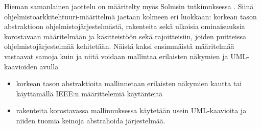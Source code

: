 \documentclass[finnish]{tktltiki2}
\numberwithin{table}{section}
\theoremstyle{definition}
\theoremstyle{remark}
\begin{document}




Hieman samanlainen jaottelu on määritelty myös Solmsin tutkimuksessa \citep{solms_what_2012}. Siinä ohjelmistoarkkitehtuuri-määritelmä jaetaan kolmeen eri luokkaan: korkean tason abstraktioon ohjelmistojärjestelmästä, rakenteita sekä ulkoisia ominaisuuksia korostavaan määritelmään ja käsitteistöön sekä rajoitteisiin, joiden puitteissa ohjelmistojärjestelmää kehitetään. Näistä kaksi ensimmäistä määritelmää vastaavat samoja kuin \cite{gorton_understanding_2011} ja niitä voidaan mallintaa erilaisten näkymien ja UML-kaavioiden avulla

\begin{itemize}
	\item korkean tason abstraktioita mallinnetaan erilaisten näkymien kautta tai käyttämällä IEEE:n määrittelemiä käytänteitä
	\item rakenteita korostavassa mallinnuksessa käytetään usein UML-kaavioita ja niiden tuomia keinoja abstrahoida järjestelmää.
	
\end{itemize}
\end{document}
